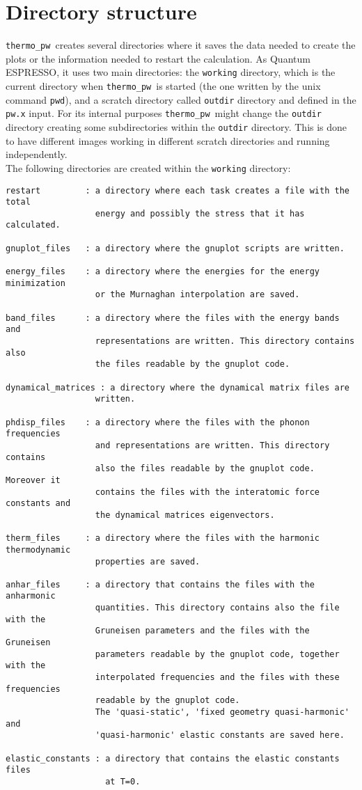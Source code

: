\documentclass[12pt,a4paper]{article}
\def\qe{{\sc Quantum ESPRESSO}}
\def\thermo{{\texttt{thermo\_pw}}}
\begin{document}
\section{\color{coral}Directory structure}
\thermo\ creates several directories where it saves the data needed to
create the plots or the information needed to restart the calculation.  
As \qe, it uses two main directories: the \texttt{working} 
directory, which is the current directory when \thermo\ is started 
(the one written by the unix command \texttt{pwd}), and a scratch directory 
called \texttt{outdir} directory and defined in the \texttt{pw.x} input. For its
internal purposes \thermo\ might change the \texttt{outdir} directory creating
some subdirectories within the \texttt{outdir} directory. This is done to
have different images working in different scratch directories and running
independently. \\
The following directories are created within the \texttt{working} directory:
\begin{verbatim}
restart         : a directory where each task creates a file with the total
                  energy and possibly the stress that it has calculated.

gnuplot_files   : a directory where the gnuplot scripts are written.

energy_files    : a directory where the energies for the energy minimization
                  or the Murnaghan interpolation are saved.

band_files      : a directory where the files with the energy bands and 
                  representations are written. This directory contains also
                  the files readable by the gnuplot code.

dynamical_matrices : a directory where the dynamical matrix files are
                  written.

phdisp_files    : a directory where the files with the phonon frequencies
                  and representations are written. This directory contains
                  also the files readable by the gnuplot code. Moreover it
                  contains the files with the interatomic force constants and
                  the dynamical matrices eigenvectors.

therm_files     : a directory where the files with the harmonic thermodynamic
                  properties are saved.

anhar_files     : a directory that contains the files with the anharmonic
                  quantities. This directory contains also the file with the
                  Gruneisen parameters and the files with the Gruneisen
                  parameters readable by the gnuplot code, together with the 
                  interpolated frequencies and the files with these frequencies
                  readable by the gnuplot code.
                  The 'quasi-static', 'fixed geometry quasi-harmonic' and
                  'quasi-harmonic' elastic constants are saved here.

elastic_constants : a directory that contains the elastic constants files
                    at T=0.
\end{verbatim}
\end{document}

